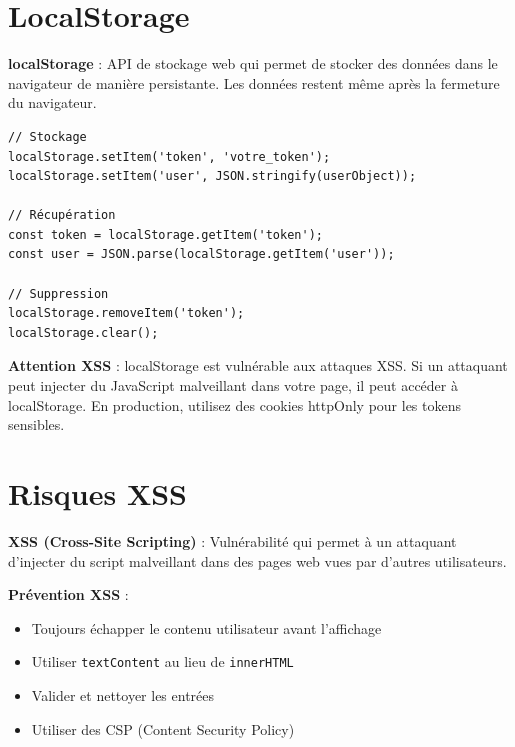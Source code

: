 \section{LocalStorage}

\begin{definitionbox}
    \textbf{localStorage} : API de stockage web qui permet de stocker des données dans le navigateur de manière persistante. Les données restent même après la fermeture du navigateur.
\end{definitionbox}

\begin{lstlisting}[style=javascript, caption=Utilisation de localStorage]
// Stockage
localStorage.setItem('token', 'votre_token');
localStorage.setItem('user', JSON.stringify(userObject));

// Récupération
const token = localStorage.getItem('token');
const user = JSON.parse(localStorage.getItem('user'));

// Suppression
localStorage.removeItem('token');
localStorage.clear();
\end{lstlisting}

\begin{warningbox}
    \textbf{Attention XSS} : localStorage est vulnérable aux attaques XSS. Si un attaquant peut injecter du JavaScript malveillant dans votre page, il peut accéder à localStorage. En production, utilisez des cookies httpOnly pour les tokens sensibles.
\end{warningbox}

\section{Risques XSS}

\begin{definitionbox}
    \textbf{XSS (Cross-Site Scripting)} : Vulnérabilité qui permet à un attaquant d'injecter du script malveillant dans des pages web vues par d'autres utilisateurs.
\end{definitionbox}

\begin{bestpracticebox}
    \textbf{Prévention XSS} :
    \begin{itemize}
        \item Toujours échapper le contenu utilisateur avant l'affichage
        \item Utiliser \texttt{textContent} au lieu de \texttt{innerHTML}
        \item Valider et nettoyer les entrées
        \item Utiliser des CSP (Content Security Policy)
    \end{itemize}
\end{bestpracticebox}

